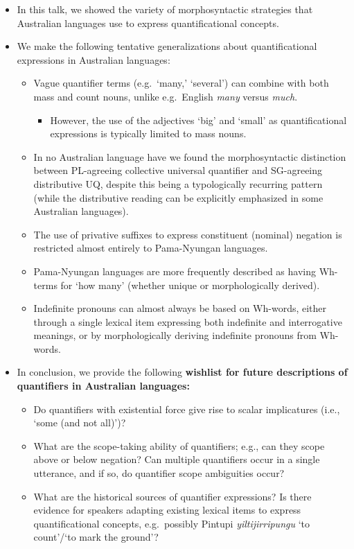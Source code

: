\documentclass{article}
\begin{document}
\begin{itemize}
\item In this talk, we showed the variety of morphosyntactic strategies that Australian languages use to express quantificational concepts.
\item We make the following tentative generalizations about quantificational expressions in Australian languages:
  \begin{itemize}
  \item Vague quantifier terms (e.g.\ `many,' `several') can combine with both mass and count nouns, unlike e.g.\ English \textit{many} versus \textit{much}.
    \begin{itemize}
    \item However, the use of the adjectives `big' and `small' as quantificational expressions is typically limited to mass nouns.
    \end{itemize}
  \item In no Australian language have we found the morphosyntactic distinction between PL-agreeing collective universal quantifier and SG-agreeing distributive UQ, despite this being a typologically recurring pattern (while the distributive reading can be explicitly emphasized in some Australian languages). %
  \item The use of privative suffixes to express constituent (nominal) negation is restricted almost entirely to Pama-Nyungan languages.
  \item Pama-Nyungan languages are more frequently described as having Wh-terms for `how many' (whether unique or morphologically derived).
  \item Indefinite pronouns can almost always be based on Wh-words, either through a single lexical item expressing both indefinite and interrogative meanings, or by morphologically deriving indefinite pronouns from Wh-words.
  \end{itemize}
\item In conclusion, we provide the following \textbf{wishlist for future descriptions of quantifiers in Australian languages:}
  \begin{itemize}
  \item Do quantifiers with existential force give rise to scalar implicatures (i.e., `some (and not all)')?
  \item What are the scope-taking ability of quantifiers; e.g., can they scope above or below negation? Can multiple quantifiers occur in a single utterance, and if so, do quantifier scope ambiguities occur?
  \item What are the historical sources of quantifier expressions? Is there evidence for speakers adapting existing lexical items to express quantificational concepts, e.g.\ possibly Pintupi \textit{yiltijirripungu} `to count'/`to mark the ground'?
  \end{itemize}
\end{itemize}

{\small 
  
  
}
\end{document}
